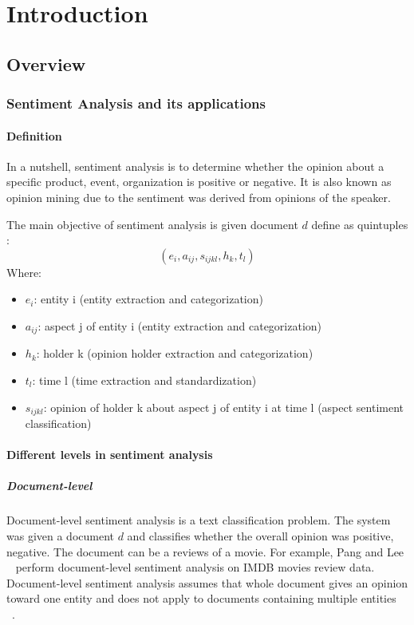 \hypertarget{chap:intro}{\chapter{Introduction}}
\section{Overview}
\subsection{Sentiment Analysis and its applications}
\subsubsection{Definition}
In a nutshell, sentiment analysis is to determine whether the opinion about a specific product, event, organization is positive or negative. It is also known as opinion mining due to the sentiment was derived from opinions of the speaker.

The main objective of sentiment analysis is given document $d$ define as quintuples \cite{liu2012sentiment}:
\[ ( e_{i}, a_{ij}, s_{ijkl}, h_{k}, t_{l} ) \]
 Where:
\begin{itemize}
	\item $e_{i}$: entity i (entity extraction and categorization)
	\item $a_{ij}$: aspect j of entity i (entity extraction and categorization)
	\item $h_{k}$: holder k (opinion holder extraction and categorization)
	\item $t_{l}$: time l (time extraction and standardization)
	\item $s_{ijkl}$: opinion of holder k about aspect j of entity i at time l (aspect sentiment classification)
\end{itemize}


\subsubsection{Different levels in sentiment analysis}
\paragraph{Document-level}
Document-level sentiment analysis is a text classification problem. The system was given a document $d$ and classifies whether the overall opinion was positive, negative. The document can be a reviews of a movie. For example, Pang and Lee ~\cite{pang2002thumbs} perform document-level sentiment analysis on IMDB movies review data. Document-level sentiment analysis assumes that whole document gives an opinion toward one entity and does not apply to documents containing multiple entities ~\cite{liu2012sentiment}.

